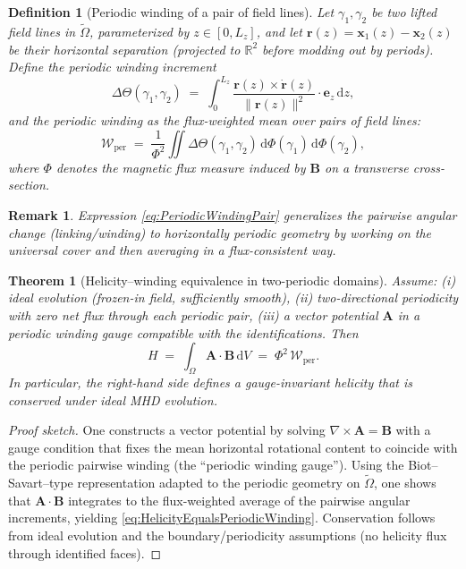 \documentclass[11pt]{article}
\newtheorem{theorem}{Theorem}
\newtheorem{defn}{Definition}
\newtheorem{remark}{Remark}
\newcommand{\curl}{\nabla\!\times\!}
\newcommand{\bbR}{\mathbb{R}}
\newcommand{\ucover}{\widetilde{\Omega}}   %
\begin{document}
\begin{defn}[Periodic winding of a pair of field lines]
Let $\gamma_1,\gamma_2$ be two \emph{lifted} field lines in $\ucover$, parameterized by $z\in[0,L_z]$, and let $\bm{r}(z)=\bm{x}_1(z)-\bm{x}_2(z)$ be their horizontal separation (projected to $\bbR^2$ before modding out by periods). Define the \emph{periodic winding increment}
\begin{equation}
\Delta\Theta(\gamma_1,\gamma_2)
\;=\;
\int_{0}^{L_z} \frac{\bm{r}(z)\times \dot{\bm{r}}(z)}{\|\bm{r}(z)\|^2}\cdot \bm{e}_z \,\mathrm{d}z,
\label{eq:PeriodicWindingPair}
\end{equation}
and the \emph{periodic winding} as the flux-weighted mean over pairs of field lines:
\begin{equation}
\mathcal{W}_{\mathrm{per}}
\;=\; \frac{1}{\Phi^2}\iint \Delta\Theta(\gamma_1,\gamma_2)\, \mathrm{d}\Phi(\gamma_1)\,\mathrm{d}\Phi(\gamma_2),
\label{eq:PeriodicWinding}
\end{equation}
where $\Phi$ denotes the magnetic flux measure induced by $\bm{B}$ on a transverse cross-section.
\end{defn}

\begin{remark}
Expression \eqref{eq:PeriodicWindingPair} generalizes the pairwise angular change (linking/winding) to horizontally periodic geometry by working on the universal cover and then averaging in a flux-consistent way.
\end{remark}

\begin{theorem}[Helicity--winding equivalence in two-periodic domains]
\label{thm:equivalence}
Assume: (i) ideal evolution (frozen-in field, sufficiently smooth), (ii) two-directional periodicity with zero net flux through each periodic pair, (iii) a vector potential $\bm{A}$ in a \emph{periodic winding gauge} compatible with the identifications. Then
\begin{equation}
H \;=\; \int_{\Omega} \bm{A}\cdot\bm{B}\,\mathrm{d}V
\;=\; \Phi^2 \, \mathcal{W}_{\mathrm{per}}.
\label{eq:HelicityEqualsPeriodicWinding}
\end{equation}
In particular, the right-hand side defines a gauge-invariant helicity that is conserved under ideal MHD evolution.
\end{theorem}

\begin{proof}[Proof sketch]
One constructs a vector potential by solving $\curl\bm{A}=\bm{B}$ with a gauge condition that fixes the mean horizontal rotational content to coincide with the periodic pairwise winding (the ``periodic winding gauge''). Using the Biot–Savart–type representation adapted to the periodic geometry on $\ucover$, one shows that $\bm{A}\cdot\bm{B}$ integrates to the flux-weighted average of the pairwise angular increments, yielding \eqref{eq:HelicityEqualsPeriodicWinding}. Conservation follows from ideal evolution and the boundary/periodicity assumptions (no helicity flux through identified faces).
\end{proof}
\end{document}
